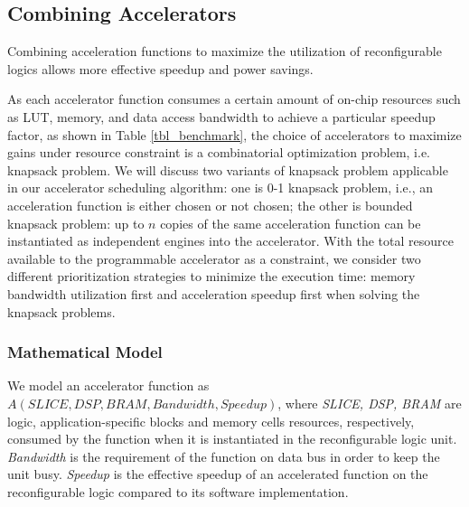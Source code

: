 \subsection{Combining Accelerators}
\label{subsec_combo}



Combining acceleration functions to maximize the utilization of reconfigurable logics
allows more effective speedup and power savings.

As each accelerator function consumes a certain amount of
on-chip resources such as LUT, memory, and data access
bandwidth to achieve a particular speedup factor, as shown in Table
\ref{tbl_benchmark}, the choice of accelerators to maximize gains
under resource constraint is a combinatorial optimization problem, i.e.
knapsack problem. We will discuss two variants of knapsack problem
applicable in our accelerator scheduling algorithm: one is 0-1
knapsack problem, i.e., an acceleration function is either chosen or not
chosen;  the other is bounded knapsack problem: up to $n$ copies of
the same acceleration function can be instantiated as independent
engines into the accelerator. With the total resource available to the programmable accelerator as
a constraint, we consider two different prioritization strategies to minimize the
execution time: memory bandwidth utilization first and acceleration
speedup first when solving the knapsack problems.

\subsubsection{Mathematical Model}

We model an accelerator function as $A(SLICE, DSP, BRAM, Bandwidth, Speedup)$,
where {\em SLICE, DSP, BRAM} are logic, application-specific blocks and
memory cells resources, respectively, consumed by the function when it is
instantiated in the reconfigurable logic unit. {\em Bandwidth} is the
requirement of the function on data bus in order to keep the unit
busy. {\em Speedup} is the effective speedup of an accelerated function on the
reconfigurable logic compared to its software implementation. 

